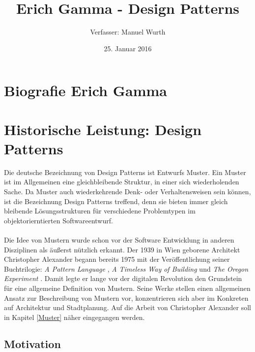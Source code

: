 \documentclass[fontsize=11pt,a4paper,final]{scrreprt}[2003/01/01]
\title{Erich Gamma - Design Patterns}
\author{Verfasser: Manuel Wurth}
\date{25. Januar 2016}
\begin{document}


\maketitle
\newpage
\tableofcontents
\newpage

\chapter{Biografie Erich Gamma}\label{se:Biografie Erich Gamma}

\chapter{Historische Leistung: Design Patterns}\label{se:Historische Leistung: Design Patterns}
Die deutsche Bezeichnung von Design Patterns ist Entwurfs Muster. Ein Muster ist im Allgemeinen eine gleichbleibende Struktur, in einer sich wiederholenden Sache. Da Muster auch wiederkehrende Denk- oder Verhaltensweisen sein können, ist die Bezeichnung Design Patterns treffend, denn sie bieten immer gleich bleibende Lösungsstrukturen für verschiedene Problemtypen im objektorierntierten Softwareentwurf.
\\ \\
Die Idee von Mustern wurde schon vor der Software Entwicklung in anderen Disziplinen als äußerst nützlich erkannt. Der 1939 in Wien geborene Architekt \mbox{Christopher} \mbox{Alexander} begann bereits 1975 mit der Veröffentlichung seiner Buchtrilogie: \textit{A Pattern Language} \cite{Alexander1979}, \textit{A Timeless Way of Building} \cite{Alexander1977} und \textit{The Oregon Experiment} \cite{Alexander1975}. Damit legte er lange vor der digitalen Revolution den Grundstein für eine allgemeine Definition von Mustern. Seine Werke stellen einen allgemeinen Ansatz zur Beschreibung von Mustern vor, konzentrieren sich aber im Konkreten auf Architektur und Stadtplanung. Auf die Arbeit von Christopher Alexander soll in Kapitel \ref{Muster} näher eingegangen werden.

\section{Motivation}\label{se:Motivation}
\end{document}

